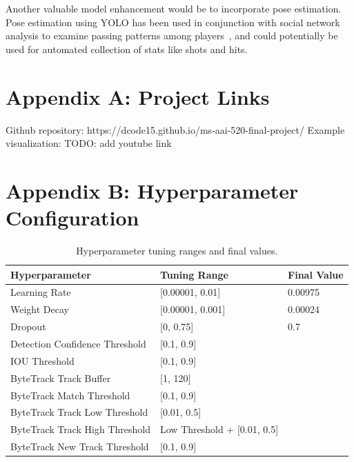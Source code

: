 \documentclass[12pt,stu,donotrepeattitle,floatsintext]{apa7}
\begin{document}
    Another valuable model enhancement would be to incorporate pose estimation.
    Pose estimation using YOLO has been used in conjunction with social network analysis to examine passing patterns among players~\parencite{pose-centric-analysis}, and could potentially be used for automated collection of stats like shots and hits.

    \printbibliography
    \clearpage

    \begin{appendices}
        \section{Appendix A: Project Links}\label{sec:project-links}
        \noindent Github repository: https://dcode15.github.io/ms-aai-520-final-project/
        \noindent Example visualization: TODO: add youtube link

        \section{Appendix B: Hyperparameter Configuration}\label{sec:hyperparameters}

        \begin{table}[tb]
        \centering
        \renewcommand{\arraystretch}{0.8}
        \begin{tabular}{|l|l|l|}
            \hline
                \textbf{Hyperparameter} & \textbf{Tuning Range} & \textbf{Final Value} \\ \hline
                Learning Rate & [0.00001, 0.01] & 0.00975 \\ \hline
                Weight Decay & [0.00001, 0.001] & 0.00024 \\ \hline
                Dropout & [0, 0.75] & 0.7 \\ \hline
                Detection Confidence Threshold & [0.1, 0.9] & \\ \hline
                IOU Threshold & [0.1, 0.9] & \\ \hline
                ByteTrack Track Buffer & [1, 120] & \\ \hline
                ByteTrack Match Threshold & [0.1, 0.9] & \\ \hline
                ByteTrack Track Low Threshold & [0.01, 0.5] & \\ \hline
                ByteTrack Track High Threshold & Low Threshold + [0.01, 0.5] & \\ \hline
                ByteTrack New Track Threshold & [0.1, 0.9] & \\ \hline
            \end{tabular}
            \\[10pt]
            \caption{Hyperparameter tuning ranges and final values.}
            \label{tab:hyperparameters}
        \end{table}

    \end{appendices}
\end{document}
